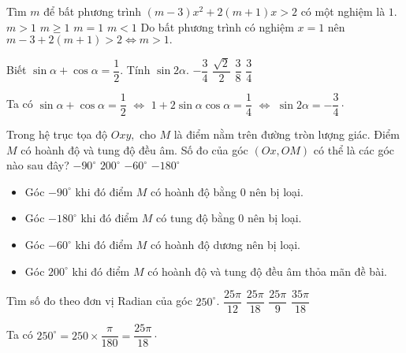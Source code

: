 \begin{ex}%
Tìm $ m $	để bất phương trình $ (m-3)x^2 + 2(m+1)x > 2 $ có một nghiệm là $ 1 $.
	\choice
	{\True $ m>1 $}
	{$ m \ge 1 $}
	{$ m  = 1 $}
	{$ m < 1 $}
	\loigiai
	{Do bất phương trình có nghiệm $ x = 1 $ nên $ m-3 + 2(m+1) > 2 \Leftrightarrow m > 1. $
}
\end{ex}
\begin{ex}%
Biết $ \sin \alpha + \cos \alpha = \dfrac{1}{2} $. Tính $ \sin 2\alpha $.
	\choice
	{\True $ -\dfrac{3}{4} $}	
	{$ \dfrac{\sqrt{2}}{2} $}
	{$ \dfrac{3}{8} $}
	{$ \dfrac{3}{4} $}
	\loigiai
	{Ta có $ \sin \alpha + \cos \alpha = \dfrac{1}{2} $ $\Leftrightarrow  $ $1+ 2 \sin \alpha \cos \alpha  = \dfrac{1}{4}$ $ \Leftrightarrow $ $ \sin 2\alpha = -\dfrac{3}{4} \cdot $
		
	}
\end{ex}
\begin{ex}%
Trong hệ trục tọa độ $ Oxy, $	cho $ M $ là điểm nằm trên đường tròn lượng giác. Điểm $ M $ có hoành độ và tung độ đều âm. Số đo của góc $ \left(Ox, OM\right) $ có thể là các góc nào sau đây?
	\choice
	{$ -90^{\circ} $}
	{\True $ 200^{\circ} $}
	{$ -60^{\circ} $}
	{$ -180^{\circ} $}
	\loigiai
	{	\begin{itemize}
			\item Góc $ -90^{\circ}  $ khi đó điểm $ M $ có hoành độ bằng $ 0 $ nên bị loại.
			\item Góc $ -180^{\circ}  $ khi đó điểm $ M $  có tung độ bằng $ 0 $ nên bị loại.
			\item Góc $ -60^{\circ}  $ khi đó điểm $ M $  có hoành độ dương nên bị loại.
			\item Góc $ 200^{\circ} $ khi đó điểm $ M $ có hoành độ và tung độ đều âm thỏa mãn đề bài.
		\end{itemize}
		
		
	}
\end{ex}
\begin{ex}%
Tìm số đo theo đơn vị Radian	của góc $ 250^\circ $.
	\choice
	{$ \dfrac{25\pi}{12} $}
	{\True $ \dfrac{25\pi}{18} $ }
	{$ \dfrac{25\pi}{9} $}
	{$ \dfrac{35\pi}{18} $}
	\loigiai
	{Ta có $ 250^\circ = 250 \times \dfrac{\pi}{180}  = \dfrac{25\pi}{18} \cdot$
		
	}
\end{ex}
